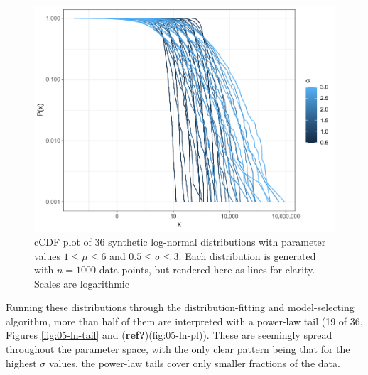 \documentclass[
  12pt,
]{book}
\begin{document}
\begin{figure}

{\centering \includegraphics[width=0.9\linewidth]{bookdown-demo_files/figure-latex/05-synth-ln-1} 

}

\caption{cCDF plot of 36 synthetic log-normal distributions with parameter values \(1 \leq \mu \leq 6\) and \(0.5 \leq \sigma \leq 3\). Each distribution is generated with \(n = 1000\) data points, but rendered here as lines for clarity. Scales are logarithmic}\label{fig:05-synth-ln}
\end{figure}

Running these distributions through the distribution-fitting and model-selecting algorithm, more than half of them are interpreted with a power-law tail (19 of 36, Figures \ref{fig:05-ln-tail} and (\textbf{ref?})(fig:05-ln-pl)). These are seemingly spread throughout the parameter space, with the only clear pattern being that for the highest \(\sigma\) values, the power-law tails cover only smaller fractions of the data.
\end{document}

